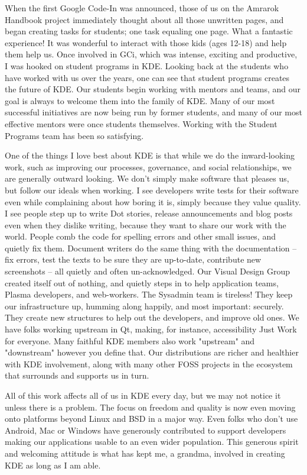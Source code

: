 When the first Google Code-In was announced, those of us on the Amrarok Handbook project immediately thought about all those unwritten pages, and began creating tasks for students; one task equaling one page. What a fantastic experience! It was wonderful to interact with those kids (ages 12-18) and help them help us. Once involved in GCi, which was intense, exciting and productive, I was hooked on student programs in KDE. Looking back at the students who have worked with us over the years, one can see that student programs creates the future of KDE. Our students begin working with mentors and teams, and our goal is always to welcome them into the family of KDE. Many of our most successful initiatives are now being run by former students, and many of our most effective mentors were once students themselves. Working with the Student Programs team has been so satisfying.

One of the things I love best about KDE is that while we do the inward-looking work, such as improving our processes, governance, and social relationships, we are generally outward looking. We don't simply make software that pleases us, but follow our ideals when working. I see developers write tests for their software even while complaining about how boring it is, simply because they value quality. I see people step up to write Dot stories, release announcements and blog posts even when they dislike writing, because they want to share our work with the world. People comb the code for spelling errors and other small issues, and quietly fix them. Document writers do the same thing with the documentation -- fix errors, test the texts to be sure they are up-to-date, contribute new screenshots -- all quietly and often un-acknowledged. Our Visual Design Group created itself out of nothing, and quietly steps in to help application teams, Plasma developers, and web-workers. The Sysadmin team is tireless! They keep our infrastructure up, humming along happily, and most important: securely. They create new structures to help out the developers, and improve old ones. We have folks working upstream in Qt, making, for instance, accessibility Just Work for everyone. Many faithful KDE members also work "upstream" and "downstream" however you define that. Our distributions are richer and healthier with KDE involvement, along with many other FOSS projects in the ecosystem that surrounds and supports us in turn.

All of this work affects all of us in KDE every day, but we may not notice it unless there is a problem. The focus on freedom and quality is now even moving onto platforms beyond Linux and BSD in a major way. Even folks who don't use Android, Mac or Windows have generously contributed to support developers making our applications usable to an even wider population. This generous spirit and welcoming attitude is what has kept me, a grandma, involved in creating KDE as long as I am able.